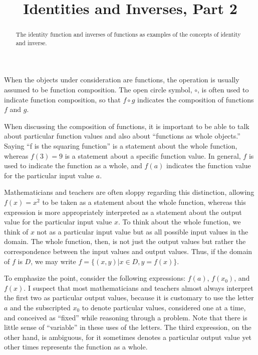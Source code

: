 \documentclass{ximera}
\title{Identities and Inverses, Part 2}
\begin{document}
\begin{abstract}
The identity function and inverses of functions as examples of the concepts of identity and inverse.    
\end{abstract}
\maketitle


%
%

When the objects under consideration are functions, the operation is usually assumed to be function composition.  The open circle symbol, $\circ$, is often used to indicate function composition, so that $f\circ g$  indicates the composition of functions $f$ and $g$.  

When discussing the composition of functions, it is important to be able to talk about particular function values and also about ``functions as whole objects.''  Saying ``f is the squaring function'' is a statement about the whole function, whereas $f(3) = 9$ is a statement about a specific function value.  In general, $f$ is used to indicate the function as a whole, and $f(a)$ indicates the function value for the particular input value $a$.  

Mathematicians and teachers are often sloppy regarding this distinction, allowing $f(x)=x^2$ to be taken as a statement about the whole function, whereas this expression is more appropriately interpreted as a statement about the output value for the particular input value $x$.  To think about the whole function, we think of $x$ not as a particular input value but as all possible input values in the domain.  The whole function, then, is not just the output values but rather the correspondence between the input values and output values.  Thus, if the domain of $f$ is $D$, we may write $f=\{(x,y) | x\in D, y=f(x)\}$.
  
To emphasize the point, consider the following expressions:  $f(a)$, $f(x_0)$, and $f(x)$.  I suspect that most mathematicians and teachers almost always interpret the first two as particular output values, because it is customary to use the letter $a$ and the subscripted $x_0$ to denote particular values, considered one at a time, and conceived as ``fixed'' while reasoning through a problem.  Note that there is little sense of ``variable'' in these uses of the letters.  The third expression, on the other hand, is ambiguous, for it sometimes denotes a particular output value yet other times represents the function as a whole.  
\end{document}
